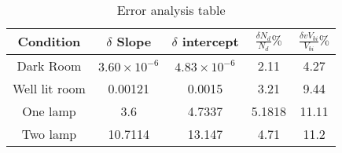 \begin{table}[H]
    \centering
    \begin{tabular}{|c|c|c|c|c|}
        \hline
        Condition     & $\delta$ Slope      & $\delta$ intercept  & $\frac{\delta N_d}{N_d}\%$ & $\frac{\delta v V_{bi}}{V_{bi}}\%$ \\ \hline
        Dark Room     & $3.60\times10^{-6}$ & $4.83\times10^{-6}$ & 2.11                       & 4.27                               \\
        Well lit room & 0.00121             & 0.0015              & 3.21                       & 9.44                               \\
        One lamp      & 3.6                 & 4.7337              & 5.1818                     & 11.11                              \\
        Two lamp      & 10.7114             & 13.147              & 4.71                       & 11.2                               \\ \hline
    \end{tabular}
    \caption{Error analysis table}
\end{table}
